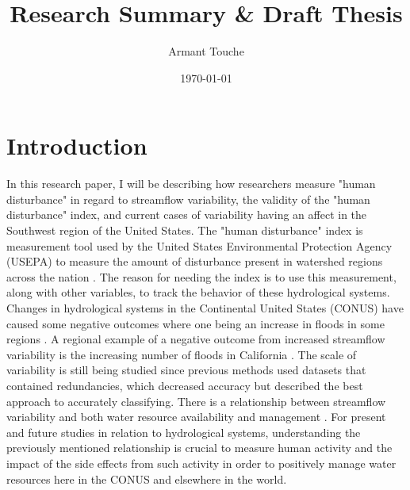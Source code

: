 \documentclass[a4paper,man,biblatex]{apa6}
\title{Research Summary \& Draft Thesis}
\author{Armant Touche}
\affiliation{Portland State University}
\date{\today}
\begin{document}
\thispagestyle{otherpage}
\setcounter{biburllcpenalty}{7000}
\setcounter{biburlucpenalty}{8000}


\section{Introduction} In this research paper, I will be describing how researchers measure "human disturbance" in regard to streamflow variability, the validity of the "human disturbance" index, and current cases of variability having an affect in the Southwest region of the United States. The "human disturbance" index is measurement tool used by the United States Environmental Protection Agency (USEPA) to measure the amount of disturbance present in watershed regions across the nation \autocite{falcone_2016}. The reason for needing the index is to use this measurement, along with other variables, to track the behavior of these hydrological systems. Changes in hydrological systems in the Continental United States (CONUS) have caused some negative outcomes where one being an increase in floods in some regions \autocite{rice_2016}. A regional example of a negative outcome from increased streamflow variability is the increasing number of floods in California \autocite{standford_2020}. The scale of variability is still being studied since previous methods used datasets that contained redundancies, which decreased accuracy but \textcite{falcone_2016} described the best approach to accurately classifying. There is a relationship between streamflow variability and both water resource availability and management \autocite{rice_2016}. For present and future studies in relation to hydrological systems, understanding the previously mentioned relationship is crucial to measure human activity and the impact of the side effects from such activity in order to positively manage water resources here in the CONUS and elsewhere in the world.
\end{document}
